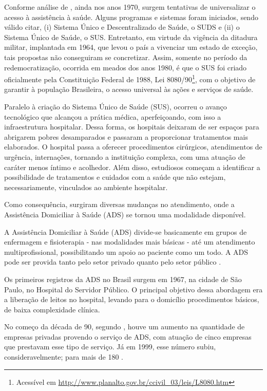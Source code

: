 Conforme análise de , ainda nos anos 1970, surgem
tentativas de universalizar o acesso à assistência à saúde. Alguns programas e
sistemas foram iniciados, sendo válido citar, (i) Sistema Único e
Descentralizado de Saúde, o SUDS e (ii) o Sistema Único de Saúde, o SUS.
Entretanto, em virtude da vigência da ditadura militar, implantada em 1964, que
levou o país a vivenciar um estado de exceção, tais propostas não conseguiram se
concretizar. Assim, somente no período da redemocratização, ocorrida em meados
dos anos 1980, é que o SUS foi criado oficialmente pela Constituição Federal de
1988, Lei 8080/90\footnote{Acessível em
\url{http://www.planalto.gov.br/ccivil_03/leis/L8080.htm}}, com o  objetivo de
garantir à população Brasileira, o acesso universal às ações e  serviços de
saúde.

Paralelo à criação do Sistema Único de Saúde (SUS), ocorreu o avanço
tecnológico que alcançou a prática médica, aperfeiçoando, com isso a
infraestrutura hospitalar. Dessa forma, os hospitais deixaram de ser espaços
para abrigarem pobres desamparados e passaram a proporcionar tratamentos mais
elaborados. O hospital passa a oferecer  procedimentos cirúrgicos, atendimentos
de urgência, internações, tornando a instituição complexa, com uma atuação de
caráter menos íntimo e acolhedor. Além disso, estudiosos começam a identificar
a possibilidade de tratamentos e cuidados com a  saúde que não estejam,
necessariamente, vinculados ao ambiente hospitalar.

Como consequência, surgiram diversas mudanças no atendimento, onde a Assistência
Domiciliar à Saúde (ADS) se tornou uma modalidade disponível.

A Assistência Domiciliar à Saúde (ADS) divide-se basicamente em grupos de
enfermagem e fisioterapia - nas modalidades mais básicas - até um atendimento
multiprofissional, possibilitando um apoio ao paciente como um todo. A ADS pode
ser provida tanto pelo setor privado quanto pelo setor público
\cite{amaral2001assistencia}.

Os primeiros registros da ADS no Brasil surgem em 1967, na cidade de São
Paulo, no Hospital do Servidor Público. O principal objetivo dessa abordagem
era a liberação de leitos no hospital, levando para o domicílio procedimentos
básicos, de baixa complexidade clínica.

No começo da década de 90, segundo ,
houve um aumento na quantidade de empresas privadas provendo o serviço de ADS,
com atuação de cinco empresas que prestavam esse tipo de  serviço. Já em 1999,
esse número subiu, consideravelmente; para mais de 180
\cite{tavolari2000desenvolvimento}.


